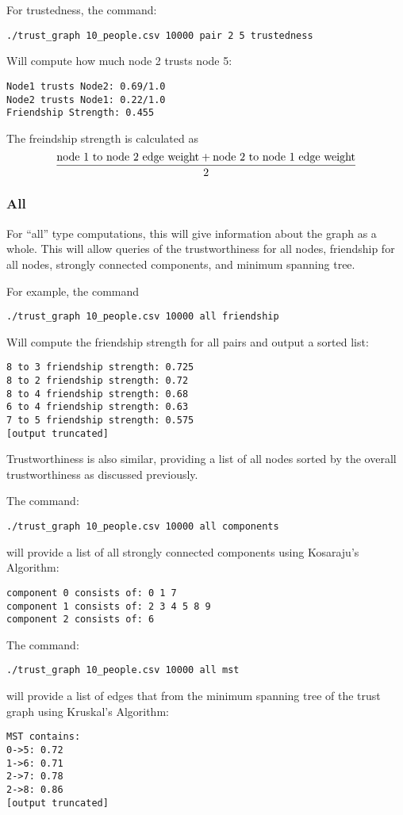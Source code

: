 \documentclass{article}
\begin{document}
For trustedness, the command: 
\begin{verbatim}
./trust_graph 10_people.csv 10000 pair 2 5 trustedness
\end{verbatim}
Will compute how much node 2 trusts node 5: 
\begin{verbatim}
Node1 trusts Node2: 0.69/1.0
Node2 trusts Node1: 0.22/1.0
Friendship Strength: 0.455
\end{verbatim}
The freindship strength is calculated as 
\[ \frac{\textnormal{node 1 to node 2 edge weight} + \textnormal{node 2 to node 1 edge weight}}{2}\]

\subsubsection{All}
For ``all'' type computations, this will give information about the graph as a whole. 
This will allow queries of the trustworthiness for all nodes, friendship for all nodes, strongly connected components, and minimum spanning tree. 

For example, the command 
\begin{verbatim}
./trust_graph 10_people.csv 10000 all friendship
\end{verbatim}
Will compute the friendship strength for all pairs and output a sorted list: 
\begin{verbatim}
8 to 3 friendship strength: 0.725
8 to 2 friendship strength: 0.72
8 to 4 friendship strength: 0.68
6 to 4 friendship strength: 0.63
7 to 5 friendship strength: 0.575
[output truncated]
\end{verbatim}

Trustworthiness is also similar, providing a list of all nodes sorted by the
overall trustworthiness as discussed previously. 

The command: 
\begin{verbatim}
./trust_graph 10_people.csv 10000 all components
\end{verbatim}
will provide a list of all strongly connected components using Kosaraju's Algorithm: 
\begin{verbatim}
component 0 consists of: 0 1 7 
component 1 consists of: 2 3 4 5 8 9 
component 2 consists of: 6
\end{verbatim}

The command:
\begin{verbatim}
./trust_graph 10_people.csv 10000 all mst
\end{verbatim}
will provide a list of edges that from the minimum spanning tree of the trust graph using Kruskal's Algorithm:
\begin{verbatim}
MST contains: 
0->5: 0.72
1->6: 0.71
2->7: 0.78
2->8: 0.86
[output truncated]
\end{verbatim}
\end{document}
